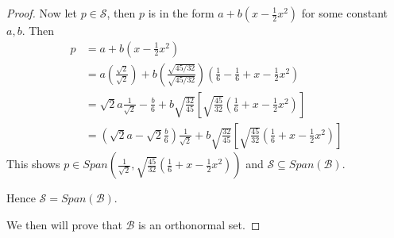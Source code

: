 \documentclass{article}
\begin{document}
\begin{proof}
Now let $p \in \mathcal{S}$, then $p$ is in the form $a+b(x-\frac{1}{2}x^2)$ for some constant $a,b$. Then 
\begin{align*}
p &= a+b(x-\frac{1}{2}x^2) \\
&= a(\frac{\sqrt{2}}{\sqrt{2}}) +b(\frac{\sqrt{45/32}}{\sqrt{45/32}}) (\frac{1}{6}-\frac{1}{6}+x-\frac{1}{2}x^2)\\
&= \sqrt{2}a \frac{1}{\sqrt{2}} -\frac{b}{6} + b\sqrt{\frac{32}{45}}[\sqrt{\frac{45}{32}}(\frac{1}{6}+x-\frac{1}{2}x^2)] \\
&=(\sqrt{2}a - \sqrt{2} \frac{b}{6}) \frac{1}{\sqrt{2}} + b\sqrt{\frac{32}{45}}[\sqrt{\frac{45}{32}}(\frac{1}{6}+x-\frac{1}{2}x^2)]
\end{align*}
This shows $p \in Span(\frac{1}{\sqrt{2}}, \sqrt{\frac{45}{32}}(\frac{1}{6}+x-\frac{1}{2}x^2))$ and $\mathcal{S} \subseteq Span(\mathcal{B})$.

Hence $\mathcal{S} = Span(\mathcal{B})$.
\medskip

We then will prove that $\mathcal{B}$ is an orthonormal set.


\end{proof}
\end{document}
